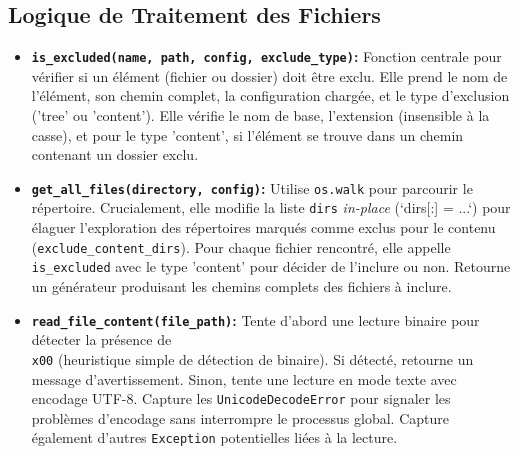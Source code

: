 \documentclass[11pt, a4paper]{article}
\begin{document}
\subsection{Logique de Traitement des Fichiers}
\begin{itemize}
    \item \textbf{\texttt{is\_excluded(name, path, config, exclude\_type)}:} Fonction centrale pour vérifier si un élément (fichier ou dossier) doit être exclu. Elle prend le nom de l'élément, son chemin complet, la configuration chargée, et le type d'exclusion ('tree' ou 'content'). Elle vérifie le nom de base, l'extension (insensible à la casse), et pour le type 'content', si l'élément se trouve dans un chemin contenant un dossier exclu.
    \item \textbf{\texttt{get\_all\_files(directory, config)}:} Utilise \texttt{os.walk} pour parcourir le répertoire. Crucialement, elle modifie la liste \texttt{dirs} \textit{in-place} (`dirs[:] = ...`) pour élaguer l'exploration des répertoires marqués comme exclus pour le contenu (\texttt{exclude\_content\_dirs}). Pour chaque fichier rencontré, elle appelle \texttt{is\_excluded} avec le type 'content' pour décider de l'inclure ou non. Retourne un générateur produisant les chemins complets des fichiers à inclure.
    \item \textbf{\texttt{read\_file\_content(file\_path)}:} Tente d'abord une lecture binaire pour détecter la présence de \texttt{\\x00} (heuristique simple de détection de binaire). Si détecté, retourne un message d'avertissement. Sinon, tente une lecture en mode texte avec encodage UTF-8. Capture les \texttt{UnicodeDecodeError} pour signaler les problèmes d'encodage sans interrompre le processus global. Capture également d'autres \texttt{Exception} potentielles liées à la lecture.
\end{itemize}
\end{document}
